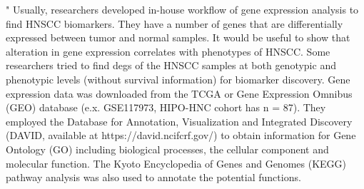 \documentclass[preprint,12pt]{elsarticle}
\newenvironment{MyColorPar}[1]{%
    \leavevmode\color{#1}\ignorespaces%
}{%
}%
\begin{document}
\begin{MyColorPar}{blue}
\begin{MyColorPar}{red}
"
Usually, researchers developed in-house workflow of gene expression analysis to find HNSCC biomarkers.
They have a number of genes that are differentially expressed between tumor and normal samples.
It would be useful to show that alteration in gene expression correlates with phenotypes of HNSCC.
Some researchers\cite{Loraine2015a}\cite{Tonella2017a}\cite{Zhao2018}\cite{Li2018a}\cite{Huang2019}\cite{Shen2019}\cite{Schmitt2019}\cite{Xu2021a} tried to find \acrfull{degs} of the HNSCC samples at both genotypic and phenotypic levels (without survival information) for biomarker discovery.
Gene expression data was downloaded from the TCGA or Gene Expression Omnibus (GEO) database (e.x. GSE117973\cite{Schmitt2019}, HIPO-HNC cohort has n = 87).
They employed the Database for Annotation, Visualization and Integrated Discovery (DAVID, available at https://david.ncifcrf.gov/) to obtain information for Gene Ontology (GO) including biological processes, the cellular component and molecular function. 
The Kyoto Encyclopedia of Genes and Genomes (KEGG) pathway analysis was also used to annotate the potential functions.

\end{MyColorPar}
\end{MyColorPar}
\end{document}
